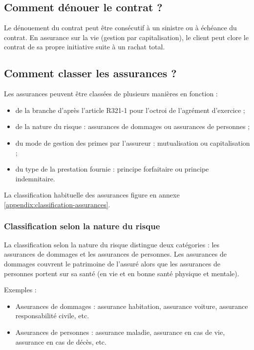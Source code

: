 \documentclass{article}
\begin{document}
\subsection{Comment dénouer le contrat ?}
Le dénouement du contrat peut être consécutif à un sinistre ou à échéance du contrat. En assurance sur la vie (gestion par capitalisation), le client peut clore le contrat de sa propre initiative suite à un rachat total.  


\subsection{Comment classer les assurances ?}
Les assurances peuvent être classées de plusieurs manières en fonction :
\begin{itemize}
    \item de la branche d'après l'article R321-1 pour l'octroi de l'agrément d'exercice ;
    \item de la nature du risque : assurances de dommages ou assurances de personnes ;
    \item du mode de gestion des primes par l'assureur : mutualisation ou capitalisation ;
    \item du type de la prestation fournie : principe forfaitaire ou principe indemnitaire.
\end{itemize}

La classification habituelle des assurances figure en annexe \ref{appendix:classification-assurances}.

\subsubsection{Classification selon la nature du risque}
La classification selon la nature du risque distingue deux catégories : les assurances de dommages et les assurances de personnes. Les assurances de dommages couvrent le patrimoine de l'assuré alors que les assurances de personnes portent sur sa santé (en vie et en bonne santé physique et mentale).

Exemples :
\begin{itemize}
    \item Assurances de dommages : assurance habitation, assurance voiture, assurance responsabilité civile, etc.
    \item Assurances de personnes : assurance maladie, assurance en cas de vie, assurance en cas de décès, etc.
\end{itemize}
\end{document}

